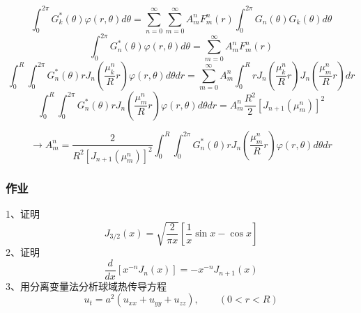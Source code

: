 \begin{frame}
	\begin{equation*}
		 \int_0 ^{2\pi} G_k ^* (\theta) \varphi(r, \theta) d\theta =\sum_{n=0}^{\infty} \sum_{m=0}^{\infty} A_m ^n F_m ^n (r) \int_0 ^{2\pi} G_n(\theta) G_k(\theta) d\theta
	\end{equation*}
	\begin{equation*}
		 \int_0 ^{2\pi} G_n  ^* (\theta) \varphi(r, \theta) d\theta = \sum_{m=0}^{\infty} A_m ^n F_m ^n (r)
	\end{equation*}
	{\small \begin{equation*}
		\int_0 ^{R} \int_0 ^{2\pi} G_n ^* (\theta) r J_n (\frac{\mu_{k}^{n}}{R}r) \varphi(r, \theta) d\theta dr = \sum_{m=0}^{\infty} A_m ^n \int_0 ^{R} r J_n (\frac{\mu_{k}^{n}}{R}r)J_n (\frac{\mu_{m}^{n}}{R}r) dr
	\end{equation*}}
	\begin{equation*}
		\int_0 ^{R} \int_0 ^{2\pi} G_n ^* (\theta) r J_n (\frac{\mu_{m}^{n}}{R}r) \varphi(r, \theta) d\theta dr = A_m ^n \frac{R^2}{2} [J_{n+1}(\mu_m ^n)]^2
	\end{equation*}
\end{frame}	

\begin{frame}
	\begin{equation*}
		\to A_m ^n=	\frac{2}{R^2[J_{n+1}(\mu_m ^n)]^2} \int_0 ^{R} \int_0 ^{2\pi} G_n ^* (\theta) r J_n (\frac{\mu_{m}^{n}}{R}r) \varphi(r, \theta) d\theta dr 
	\end{equation*}
\end{frame}

\begin{frame}
	\frametitle{作业}
	1、证明 
	\begin{equation*}
		J_{3/2}(x)=\sqrt{\frac{2}{\pi x}} [\frac{1}{x}\sin x -\cos x]
	\end{equation*}
	2、证明
	\begin{equation*}
		\frac{d}{d x}\left[x^{-n} J_{n}(x)\right]=-x^{-n} J_{n+1}(x) 
	\end{equation*}	
	3、用分离变量法分析球域热传导方程
	\begin{equation*}
		u_t=a^2 (u_{xx}+u_{yy}+u_{zz}), \qquad (0<r<R)
	\end{equation*}	
\end{frame}	
